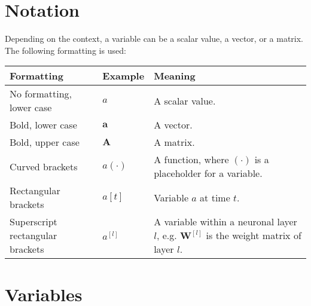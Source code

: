 \section{Notation}

Depending on the context, a variable can be a scalar value, a vector, or a matrix. The following formatting is used:

\renewcommand{\arraystretch}{1.3}
\begin{tabular}{ p{5cm} p{2cm} p{7cm} }
	\textbf{Formatting} & \textbf{Example} & \textbf{Meaning}\\
	\hline
  	No formatting, lower case & $a$ & A scalar value.\\
  	Bold, lower case & $\boldsymbol{a}$ & A vector.\\
  	Bold, upper case & $\boldsymbol{A}$ & A matrix.\\
  	Curved brackets & $a(\cdot)$ & A function, where $(\cdot)$ is a placeholder for a variable.\\
  	Rectangular brackets & $a[t]$ & Variable $a$ at time $t$.\\
   Superscript rectangular brackets & $a^{[l]}$ & A variable within a neuronal layer $l$, e.g. $\boldsymbol{W}^{[l]}$ is the weight matrix of layer $l$.\\
\end{tabular}

\section{Variables}

